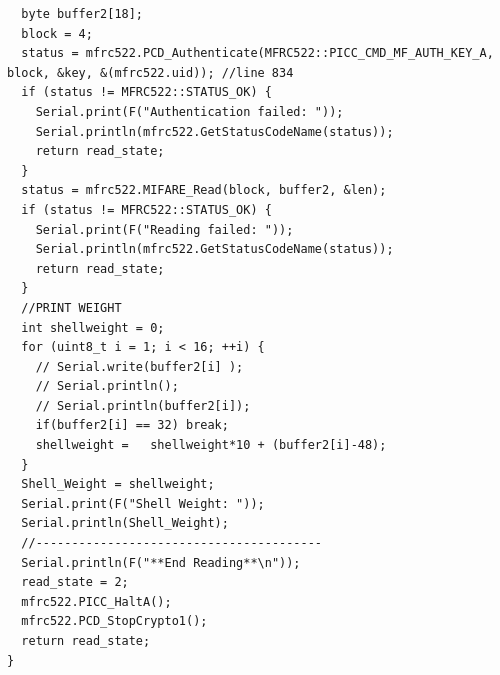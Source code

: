 \documentclass{article}
\begin{document}
\begin{lstlisting}
  byte buffer2[18];
  block = 4;
  status = mfrc522.PCD_Authenticate(MFRC522::PICC_CMD_MF_AUTH_KEY_A, block, &key, &(mfrc522.uid)); //line 834
  if (status != MFRC522::STATUS_OK) {
    Serial.print(F("Authentication failed: "));
    Serial.println(mfrc522.GetStatusCodeName(status));
    return read_state;
  }
  status = mfrc522.MIFARE_Read(block, buffer2, &len);
  if (status != MFRC522::STATUS_OK) {
    Serial.print(F("Reading failed: "));
    Serial.println(mfrc522.GetStatusCodeName(status));
    return read_state;
  }
  //PRINT WEIGHT
  int shellweight = 0;
  for (uint8_t i = 1; i < 16; ++i) {
    // Serial.write(buffer2[i] );
    // Serial.println();
    // Serial.println(buffer2[i]);
    if(buffer2[i] == 32) break;
    shellweight =   shellweight*10 + (buffer2[i]-48);
  }
  Shell_Weight = shellweight;
  Serial.print(F("Shell Weight: "));
  Serial.println(Shell_Weight);
  //----------------------------------------
  Serial.println(F("**End Reading**\n"));
  read_state = 2;
  mfrc522.PICC_HaltA();
  mfrc522.PCD_StopCrypto1();
  return read_state;
}
\end{lstlisting}
\end{document}
